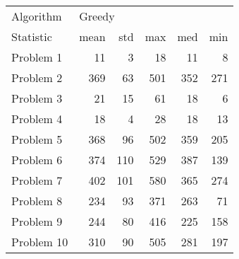 \begin{tabular}{lrrrrr}
\toprule
Algorithm & \multicolumn{5}{l}{Greedy} \\
Statistic &   mean &  std &  max &  med &  min \\
\midrule
Problem 1  &     11 &    3 &   18 &   11 &    8 \\
Problem 2  &    369 &   63 &  501 &  352 &  271 \\
Problem 3  &     21 &   15 &   61 &   18 &    6 \\
Problem 4  &     18 &    4 &   28 &   18 &   13 \\
Problem 5  &    368 &   96 &  502 &  359 &  205 \\
Problem 6  &    374 &  110 &  529 &  387 &  139 \\
Problem 7  &    402 &  101 &  580 &  365 &  274 \\
Problem 8  &    234 &   93 &  371 &  263 &   71 \\
Problem 9  &    244 &   80 &  416 &  225 &  158 \\
Problem 10 &    310 &   90 &  505 &  281 &  197 \\
\bottomrule
\end{tabular}
